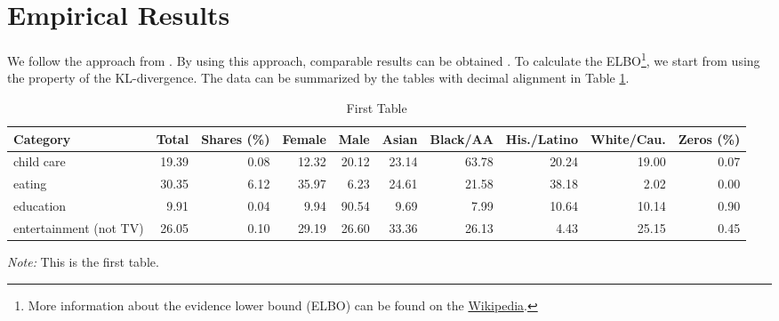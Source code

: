 \documentclass[11pt, letterpaper]{article}
\begin{document}
\section{Empirical Results}
We follow the approach from \cite{HL2019}. By using this approach, comparable results can be obtained \citep{CES2013}. To calculate the ELBO\footnote{More information about the evidence lower bound (ELBO) can be found on the \href{https://en.wikipedia.org/wiki/Evidence_lower_bound}{Wikipedia}. }, we start from using the property of the KL-divergence. The data can be summarized by the tables with decimal alignment in Table \ref{summary_a}.

\lipsum[107-109]

\renewcommand*\arraystretch{0.97}
\renewcommand{\tabcolsep}{2.5pt}
\begin{table}[H]
  \renewcommand{\thetable}{B.\arabic{table}a}
  \caption{First Table}
  \label{summary_a}
  \fontsize{10}{11}\selectfont
  \hspace*{-0.5cm}
  \begin{tabular}{lrrrrrrrrr}
    \toprule
    Category                   & Total & Shares (\%) & Female & Male  & Asian & Black/AA & His./Latino & White/Cau. & Zeros (\%) \\ \hline
    child care                 & 19.39 & 0.08   & 12.32  & 20.12 & 23.14 & 63.78    & 20.24       & 19.00      & 0.07  \\
    eating                     & 30.35 & 6.12   & 35.97  & 6.23 & 24.61 & 21.58    & 38.18       & 2.02      & 0.00  \\
    education                  & 9.91  & 0.04   & 9.94   & 90.54  & 9.69  & 7.99     & 10.64        & 10.14      & 0.90  \\
    entertainment (not TV)     & 26.05 & 0.10   & 29.19  & 26.60 & 33.36 & 26.13    & 4.43       & 25.15      & 0.45  \\ \bottomrule
  \end{tabular}
  \hspace*{-1cm}
  \begin{minipage}{1\textwidth}
    \onehalfspacing
    \vspace*{0.05cm}
    \begin{tablenotes}
      \footnotesize
      \item\textit{Note:} This is the first table.
    \end{tablenotes}
  \end{minipage}
\end{table}
\end{document}
